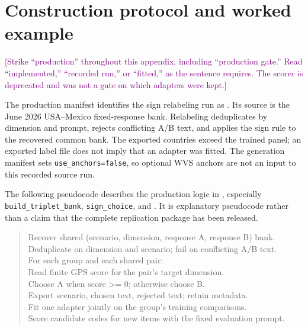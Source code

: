 \appendix
\section{Construction protocol and worked example}\label{app:protocol}

\textcolor{purple}{[Strike ``production'' throughout this appendix, including ``production gate.'' Read ``implemented,'' ``recorded run,'' or ``fitted,'' as the sentence requires. The scorer is deprecated and was not a gate on which adapters were kept.]}

The production manifest identifies the sign relabeling run as . Its source is the June 2026 USA--Mexico fixed-response bank. Relabeling deduplicates by dimension and prompt, rejects conflicting A/B text, and applies the sign rule to the recovered common bank. The exported countries exceed the trained panel; an exported label file does not imply that an adapter was fitted. The generation manifest sets \texttt{use\_anchors=false}, so optional WVS anchors are not an input to this recorded source run.

The following pseudocode describes the production logic in , especially \texttt{build\_triplet\_bank}, \texttt{sign\_choice}, and . It is explanatory pseudocode rather than a claim that the complete replication package has been released.
\begin{quote}\ttfamily\small
Recover shared (scenario, dimension, response A, response B) bank.\\
Deduplicate on dimension and scenario; fail on conflicting A/B text.\\
For each group and each shared pair:\\
\hspace*{1em}Read finite GPS score for the pair's target dimension.\\
\hspace*{1em}Choose A when score >= 0; otherwise choose B.\\
\hspace*{1em}Export scenario, chosen text, rejected text; retain metadata.\\
Fit one adapter jointly on the group's training comparisons.\\
Score candidate codes for new items with the fixed evaluation prompt.
\end{quote}

